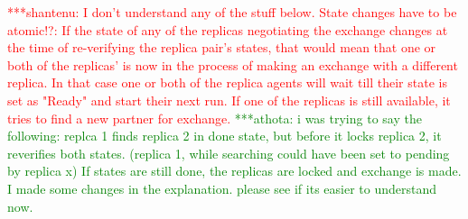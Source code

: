 \documentclass{rspublic}
\newcommand{\jhanote}[1]{ {\textcolor{red} { ***shantenu: #1 }}}
\newcommand{\alnote}[1]{ {\textcolor{blue} { ***andre: #1 }}}
\newcommand{\athotanote}[1]{ {\textcolor{green} { ***athota: #1 }}}
\newcommand{\alnote}[1]{}
\newcommand{\athotanote}[1]{}
\newcommand{\jhanote}[1]{}
\begin{document}
\jhanote{I don't understand any of the stuff below. State changes have
  to be atomic!?:  If the state of any of the replicas negotiating the
exchange changes at the time of re-verifying the replica pair's
states, that would mean that one or both of the replicas' is now in
the process of making an exchange with a different replica. In that
case one or both of the replica agents will wait till their state is
set as "Ready" and start their next run. If one of the replicas is
still available, it tries to find a new partner for exchange.} \athotanote{i was trying to say the following: replca 1 finds replica 2 in done state, but before it locks replica 2, it reverifies both states. (replica 1, while searching  could have been set to pending by replica x) If states are still done, the replicas are locked and exchange is made. I made some changes in the explanation. please see if its easier to understand now.}

\end{document}

